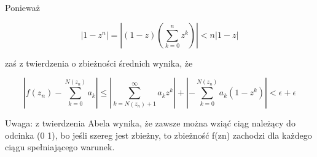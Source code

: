 \documentclass{article}
\begin{document}
Ponieważ

\begin{equation}
	|1-z^{n}|=\left|(1-z)\left(\sum _{k=0}^{n}z^{k}\right)\right|<n|1-z|
\end{equation}

zaś z twierdzenia o zbieżności średnich wynika, że 

\begin{displaymath}
	\left|f(z_{n})-\sum _{k=0}^{N(z_{n})}a_{k}\right|\leq \left|\sum _{k=N(z_{n})+1}^{\infty }a_{k}z^{k}\right|+\left|-\sum _{k=0}^{N(z_{n})}a_{k}(1-z^{k})\right|<\epsilon +\epsilon
\end{displaymath}

Uwaga: z twierdzenia Abela wynika, że zawsze można wziąć ciąg należący do odcinka (0 1), bo jeśli szereg jest zbieżny, to zbieżność f(zn) zachodzi dla każdego ciągu spełniającego warunek.
\end{document}
